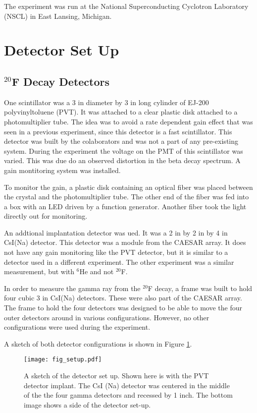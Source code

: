 
The experiment was run at the National Superconducting Cyclotron Laboratory (NSCL) in East Lansing, Michigan. 

\section{Detector Set Up}

\subsection{$^{20}$F Decay Detectors}
One scintillator was a 3 in diameter by 3 in long cylinder of EJ-200 polyvinyltoluene (PVT).
It was attached to a clear plastic disk attached to a photomultiplier tube.
The idea was to avoid a rate dependent gain effect that was seen in a previous experiment, since this detector is a fast scintillator.
This detector was built by the colaborators and was not a part of any pre-existing system. 
During the experiment the voltage on the PMT of this scintillator was varied.
This was due do an observed distortion in the beta decay spectrum.
A gain montitoring system was installed.

To monitor the gain, a plastic disk containing an optical fiber was placed between the crystal and the photomultiplier tube. 
The other end of the fiber was fed into a box with an LED driven by a function generator. 
Another fiber took the light directly out for monitoring.

An addtional implantation detector was ued.
It was a 2 in by 2 in by 4 in  CsI(Na) detector. 
This detector was a module from the CAESAR array.
It does not have any gain monitoring like the PVT detector, but it is similar to a detector used in a different experiment. 
The other experiment was a similar measurement, but with $^{6}$He and not $^{20}$F.

In order to measure the gamma ray from the $^{20}$F decay, a frame was built to hold four cubic 3 in CsI(Na) detectors.  
These were also part of the CAESAR array.
The frame to hold the four detectors was designed to be able to move the four outer detectors around in various configurations.
However, no other configurations were used during the experiment. 

A sketch of both detector configurations is shown in Figure \ref{fig:detsketch}.

\begin{figure}
	\texttt{[image: fig\_setup.pdf]}
	\caption{A sketch of the detector set up. 
	Shown here is with the PVT detector implant.
	The CsI (Na) detector was centered in the middle of the the four gamma detectors and recessed by 1 inch.
	The bottom image shows a side of the detector set-up.}
	\label{fig:detsketch}
\end{figure}

